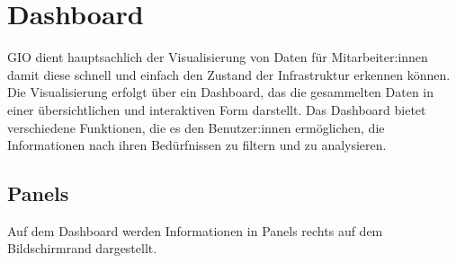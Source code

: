 \section{Dashboard}

GIO dient hauptsachlich der Visualisierung von Daten für Mitarbeiter:innen 
damit diese schnell und einfach den Zustand der Infrastruktur erkennen können. 
Die Visualisierung erfolgt über ein Dashboard, 
das die gesammelten Daten in einer übersichtlichen und interaktiven Form darstellt. 
Das Dashboard bietet verschiedene Funktionen, die es den Benutzer:innen ermöglichen, 
die Informationen nach ihren Bedürfnissen zu filtern und zu analysieren.

\subsection{Panels}
Auf dem Dashboard werden Informationen in Panels rechts auf dem Bildschirmrand dargestellt.
